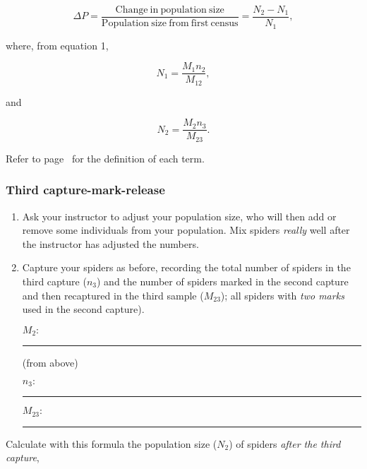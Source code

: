 \documentclass[12pt, hidelinks]{exam}
\begin{document}
\begin{questions}
\begin{equation}
	\Delta P = \dfrac{\mathrm{Change~in~population~size}}{\mathrm{Population~size~from~first~census}} = \dfrac{N_2 - N_1}{N_1},
\end{equation}

where, from equation 1, 

\begin{equation*}
N_1 = \dfrac{M_1 n_2}{M_{12}},
\end{equation*}

and

\begin{equation}
N_2 = \dfrac{M_2 n_3}{M_{23}}.
\end{equation}

Refer to page~\pageref{eq:terms} for the definition of each term.  

\subsubsection*{Third capture-mark-release}\label{sec:third-mark}

\begin{enumerate}

	\item Ask your instructor to adjust your population size, who will then add or remove
some individuals from your population. Mix spiders \emph{really} well
after the instructor has adjusted the numbers.

	\item Capture your spiders as before, recording the total number of spiders in
the third capture ($n_3$) and the number of
spiders marked in the second capture and then recaptured in the third
sample ($M_{23}$); all spiders with \emph{two marks} used in the
second capture).  

	\begin{multicols}{2}
		$M_2\colon$ \rule{0.75in}{0.4pt} (from above) \bigskip

		$n_3\colon$ \rule{0.75in}{0.4pt} 
	
		\columnbreak 
		
		$M_{23}\colon$ \rule{0.75in}{0.4pt}\bigskip
	
	\end{multicols}
	
\end{enumerate}

\question
Calculate with this formula the population size ($N_2$) of
spiders \emph{after the third capture},


\end{questions}
\end{document}
